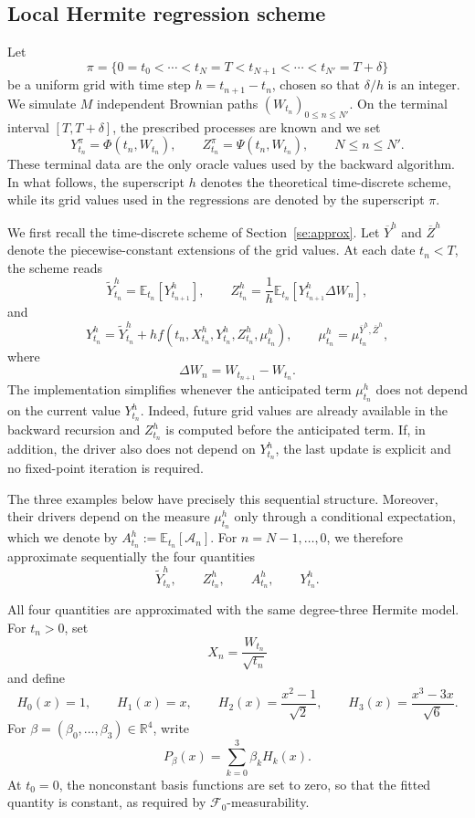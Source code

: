 \subsection{Local Hermite regression scheme}

Let
\[
\pi=\{0=t_0<\cdots<t_N=T<t_{N+1}<\cdots<t_{N'}=T+\delta\}
\]
be a uniform grid with time step $h=t_{n+1}-t_n$, chosen so that
$\delta/h$ is an integer. We simulate $M$ independent Brownian paths
$(W_{t_n})_{0\leq n\leq N'}$. On the terminal interval $[T,T+\delta]$,
the prescribed processes are known and we set
\[
Y^\pi_{t_n}=\Phi(t_n,W_{t_n}),
\qquad
Z^\pi_{t_n}=\Psi(t_n,W_{t_n}),
\qquad N\leq n\leq N'.
\]
These terminal data are the only oracle values used by the backward algorithm.
In what follows, the superscript $h$ denotes the theoretical time-discrete
scheme, while its grid values used in the regressions are denoted by the
superscript $\pi$.

We first recall the time-discrete scheme of Section~\ref{se:approx}. Let
$\overline Y^h$ and $\overline Z^h$ denote the piecewise-constant extensions of
the grid values. At each date $t_n<T$, the scheme reads
\[
\widetilde Y^h_{t_n}
=
\mathbb E_{t_n}\!\left[Y^h_{t_{n+1}}\right],
\qquad
Z^h_{t_n}
=
\frac{1}{h}\mathbb E_{t_n}\!\left[
Y^h_{t_{n+1}}\Delta W_n
\right],
\]
and
\[
Y^h_{t_n}
=
\widetilde Y^h_{t_n}
+h f\!\left(
t_n,X^h_{t_n},Y^h_{t_n},Z^h_{t_n},\mu^h_{t_n}
\right),
\qquad
\mu^h_{t_n}=\mu^{\overline Y^h,\overline Z^h}_{t_n},
\]
where
\[
\Delta W_n=W_{t_{n+1}}-W_{t_n}.
\]
The implementation simplifies whenever the anticipated term $\mu^h_{t_n}$ does
not depend on the current value $Y^h_{t_n}$. Indeed, future grid values are
already available in the backward recursion and $Z^h_{t_n}$ is computed before
the anticipated term. If, in addition, the driver also does not depend on
$Y^h_{t_n}$, the last update is explicit and no fixed-point iteration is
required.

The three examples below have precisely this sequential structure. Moreover,
their drivers depend on the measure $\mu^h_{t_n}$ only through a conditional
expectation, which we denote by
$A^h_{t_n}:=\mathbb{E}_{t_n}[\mathcal{A}_n]$. For
$n=N-1,\ldots,0$, we therefore approximate sequentially the four quantities
\[
\widetilde Y^h_{t_n},
\qquad
Z^h_{t_n},
\qquad
A^h_{t_n},
\qquad
Y^h_{t_n}.
\]

All four quantities are approximated with the same degree-three Hermite model.
For $t_n>0$, set
\[
X_n=\frac{W_{t_n}}{\sqrt{t_n}}
\]
and define
\[
H_0(x)=1,
\qquad
H_1(x)=x,
\qquad
H_2(x)=\frac{x^2-1}{\sqrt 2},
\qquad
H_3(x)=\frac{x^3-3x}{\sqrt 6}.
\]
For $\beta=(\beta_0,\ldots,\beta_3)\in\mathbb R^4$, write
\[
P_\beta(x)
=
\sum_{k=0}^3\beta_k H_k(x).
\]
At $t_0=0$, the nonconstant basis functions are set to zero, so that the fitted
quantity is constant, as required by $\mathcal F_0$-measurability.

